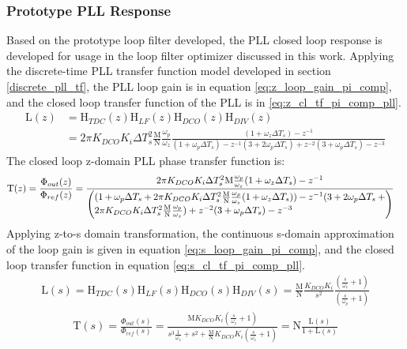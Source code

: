 		\subsubsection{Prototype PLL Response}\label{proto_pll_tfs}
		Based on the prototype loop filter developed, the PLL closed loop response is developed for usage in the loop filter optimizer discussed in this work. Applying the discrete-time PLL transfer function model developed in section \ref{discrete_pll_tf}, the PLL loop gain is in equation \ref{eq:z_loop_gain_pi_comp}, and the closed loop transfer function of the PLL is in \ref{eq:z_cl_tf_pi_comp_pll}.
		\begin{align}
			\mathrm{L}(z) &= \mathrm{H}_{TDC}(z)\mathrm{H}_{LF}(z)\mathrm{H}_{DCO}(z)\mathrm{H}_{DIV}(z) \\
			&= 2\pi K_{DCO}K_i\Delta T_s^2\frac{\mathrm{M}}{\mathrm{N}}\frac{\omega_p}{\omega_z}\frac{(1+\omega_z\Delta T_s)-z^{-1}}{(1+\omega_p\Delta T_s) - z^{-1}(3+2\omega_p\Delta T_s) + z^{-2}(3+\omega_p\Delta T_s) - z^{-3}}\label{eq:z_loop_gain_pi_comp}
		\end{align}
		The closed loop z-domain PLL phase transfer function is:
		\begin{align}\label{eq:z_cl_tf_pi_comp_pll}
			\mathrm{T}(z) = \frac{\Phi_{out}(z)}{\Phi_{ref}(z)} &= \frac{2\pi K_{DCO}K_i\Delta T_s^2\mathrm{M}\frac{\omega_p}{\omega_z}(1+\omega_z\Delta T_s)-z^{-1}}{\left(\parbox{4.2in}{$(1+\omega_p\Delta T_s + 2\pi K_{DCO}K_i\Delta T_s^2\frac{\mathrm{M}}{\mathrm{N}}\frac{\omega_p}{\omega_z}(1+\omega_z\Delta T_s))- z^{-1}(3+2\omega_p\Delta T_s+2\pi K_{DCO}K_i\Delta T_s^2\frac{\mathrm{M}}{\mathrm{N}}\frac{\omega_p}{\omega_z})+ z^{-2}(3+\omega_p\Delta T_s) - z^{-3}$}\right)}%
		\end{align}
		Applying z-to-s domain transformation, the continuous s-domain approximation of the loop gain is given in equation \ref{eq:s_loop_gain_pi_comp}, and the closed loop transfer function in equation \ref{eq:s_cl_tf_pi_comp_pll}.
		\begin{align}
			\mathrm{L}(s) = \mathrm{H}_{TDC}(s)\mathrm{H}_{LF}(s)\mathrm{H}_{DCO}(s)\mathrm{H}_{DIV}(s) = \frac{\mathrm{M}}{\mathrm{N}}\frac{K_{DCO}K_i}{s^2} \frac{\left(\frac{s}{\omega_z} + 1\right)}{\left(\frac{s}{\omega_p} + 1\right)}\label{eq:s_loop_gain_pi_comp}
		\end{align}
		\begin{align}\label{eq:s_cl_tf_pi_comp_pll}
			\mathrm{T}(s)=\frac{\Phi_{out}(s)}{\Phi_{ref}(s)} = \frac{\mathrm{M}K_{DCO}K_i\left(\frac{s}{\omega_z} + 1\right)}{s^3\frac{1}{\omega_z} + s^2 + \frac{\mathrm{M}}{\mathrm{N}}K_{DCO}K_i\left(\frac{s}{\omega_z} + 1\right)} = \mathrm{N}\frac{\mathrm{L}(s)}{1+\mathrm{L}(s)} 
		\end{align}



